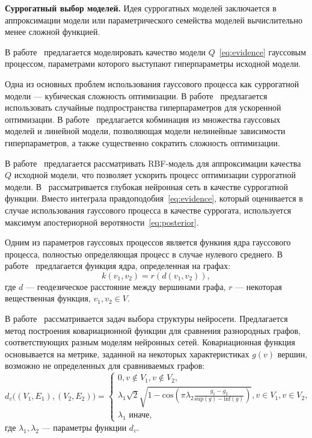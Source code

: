 \textbf{Суррогатный выбор моделей. }
Идея суррогатных моделей заключается в аппроксимации модели или параметрического семейства моделей вычислительно менее сложной функцией.

В работе~\cite{bo_gp} предлагается моделировать качество модели $Q$~\eqref{eq:evidence} гауссовым процессом, параметрами которого выступают гиперпараметры исходной модели.

Одна из основных проблем использования гауссового процесса как суррогатной модели --- кубическая сложность оптимизации. В работе~\cite{random_gaus} предлагается использовать случайные подпространства гиперпараметров для ускоренной оптимизации.  В работе~\cite{gp_tree} предлагается кобминация из множества гауссовых моделей и линейной модели, позволяющая модели нелинейные зависимости гиперпараметров, а также существенно сократить сложность оптимизации. 

В работе~\cite{rbf_surrogate} предлагается рассматривать RBF-модель для аппроксимации качества $Q$ исходной модели, что позволяет ускорить процесс оптимизации суррогатной модели. В~\cite{snoek_deep} рассматривается глубокая нейронная сеть в качестве суррогатной функции. Вместо интеграла правдоподобия~\eqref{eq:evidence}, который оценивается в случае использования гауссового процесса в качестве суррогата, используется максимум апостериорной веротяности~\eqref{eq:posterior}.

Одним из параметров гауссовых процессов является функиия ядра гауссового процесса, полностью определяющая процесс в случае нулевого среднего. В работе~\cite{gp_fusion} предлагается функция ядра, определенная на графах:
    \[
    k(v_1,v_2) = r(d(v_1,v_2)),
    \]
где $d$ --- геодезическое расстояние между вершинами графа, $r$ --- некоторая вещественная функция, $v_1, v_2 \in V$.

В работе~\cite{gp_arc} рассматривается задач выбора структуры нейросети. Предлагается метод построения ковариационной функции для сравнения разнородных графов, соответствующих разным моделям нейронных сетей. Ковариационная функция основывается на метрике, заданной на некоторых характеристиках $g(v)$ вершин, возможно не определенных для сравниваемых графов:
\[
    d_v\bigl( (V_1, E_1), (V_2,E_2) \bigr) = \begin{cases}
    0, v \not \in V_1, v \not \in V_2,\\    
    \lambda_1\sqrt{2}\sqrt{1- \text{cos}(\pi\lambda_2\frac{g_1 - g_2}{\text{sup}(g) - \text{inf}(g) })}, v \in V_1, v \in V_2,\\
    \lambda_1 \text{ иначе,}
    \end{cases}
\]
где $\lambda_1, \lambda_2$ --- параметры функции $d_v$.

